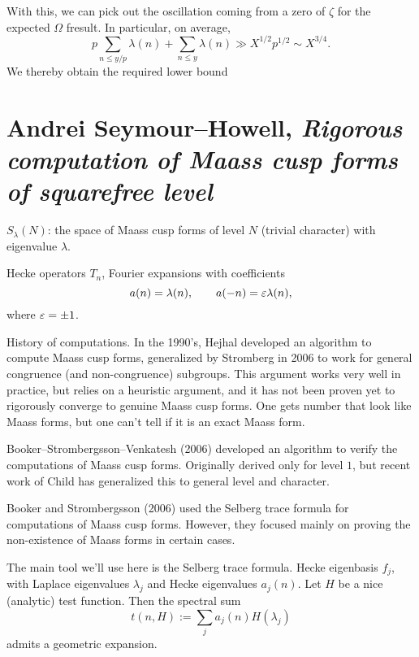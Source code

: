 \documentclass[reqno]{amsart} 
\begin{document}
With this, we can pick out the oscillation coming from a zero of $\zeta$ for the expected $\Omega$ fresult.  In particular, on average,
\begin{equation*}
p \sum_{n \leq y / p } \lambda (n ) + \sum_{n \leq y } \lambda (n ) \gg X^{1/2} p^{1/2} \sim X^{3/4}.
\end{equation*}
We thereby obtain the required lower bound

\section{Andrei Seymour--Howell, \emph{Rigorous computation of Maass cusp forms of squarefree level}}

$S_\lambda(N)$: the space of Maass cusp forms of level $N$ (trivial character) with eigenvalue $\lambda$.

Hecke operators $T_n$, Fourier expansions with coefficients
\begin{equation*}
  a(n) = \lambda(n),
  \qquad
  a(-n) = \varepsilon \lambda(n),
\end{equation*}
where $\varepsilon = \pm 1$.

History of computations.  In the 1990's, Hejhal developed an algorithm to compute Maass cusp forms, generalized by Stromberg in 2006 to work for general congruence (and non-congruence) subgroups.  This argument works very well in practice, but relies on a heuristic argument, and it has not been proven yet to rigorously converge to genuine Maass cusp forms.  One gets number that look like Maass forms, but one can't tell if it is an exact Maass form.

Booker--Strombergsson--Venkatesh (2006) developed an algorithm to verify the computations of Maass cusp forms.  Originally derived only for level $1$, but recent work of Child has generalized this to general level and character.

Booker and Strombergsson (2006) used the Selberg trace formula for computations of Maass cusp forms.  However, they focused mainly on proving the non-existence of Maass forms in certain cases.

The main tool we'll use here is the Selberg trace formula.  Hecke eigenbasis $f_j$, with Laplace eigenvalues $\lambda_j$ and Hecke eigenvalues $a_j (n)$.  Let $H$ be a nice (analytic) test function.  Then the spectral sum
\begin{equation*}
  t(n,H) := \sum_j a_j (n ) H (\lambda_j )
\end{equation*}
admits a geometric expansion.
\end{document}

